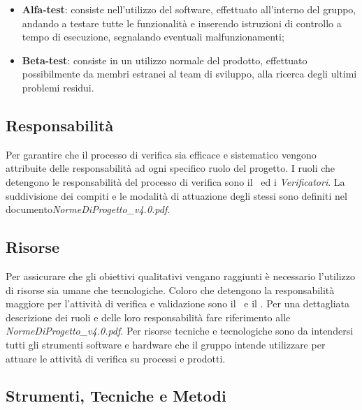 \begin{itemize}
	\item \textbf{Alfa-test}: consiste nell'utilizzo del software, effettuato all'interno del gruppo, andando a testare tutte le funzionalità e inserendo istruzioni di controllo a tempo di esecuzione, segnalando eventuali malfunzionamenti;
	\item \textbf{Beta-test}: consiste in un utilizzo normale del prodotto, effettuato possibilmente da membri estranei al team di sviluppo, alla ricerca degli ultimi problemi residui.
\end{itemize}

\subsection{Responsabilità}
Per garantire che il processo di verifica sia efficace e sistematico vengono attribuite delle responsabilità ad ogni specifico ruolo del progetto. I ruoli che detengono le responsabilità del processo di verifica sono il \ruoloResponsabile\ ed i {\textit{Verificatori}}. La suddivisione dei compiti e le modalità di attuazione degli stessi sono definiti nel documento\textit{NormeDiProgetto\_v4.0.pdf}.

\subsection{Risorse}
Per assicurare che gli obiettivi qualitativi vengano raggiunti è necessario l'utilizzo di risorse sia umane che tecnologiche. Coloro che detengono la responsabilità maggiore per l'attività di verifica e validazione sono il \ruoloResponsabile\ e il \ruoloVerificatore. Per una dettagliata descrizione dei ruoli e delle loro responsabilità fare riferimento alle \textit{NormeDiProgetto\_v4.0.pdf}. Per risorse tecniche e tecnologiche sono da intendersi tutti gli strumenti software e hardware che il gruppo intende utilizzare per attuare le attività di verifica su processi e prodotti.

\subsection{Strumenti, Tecniche e Metodi}
